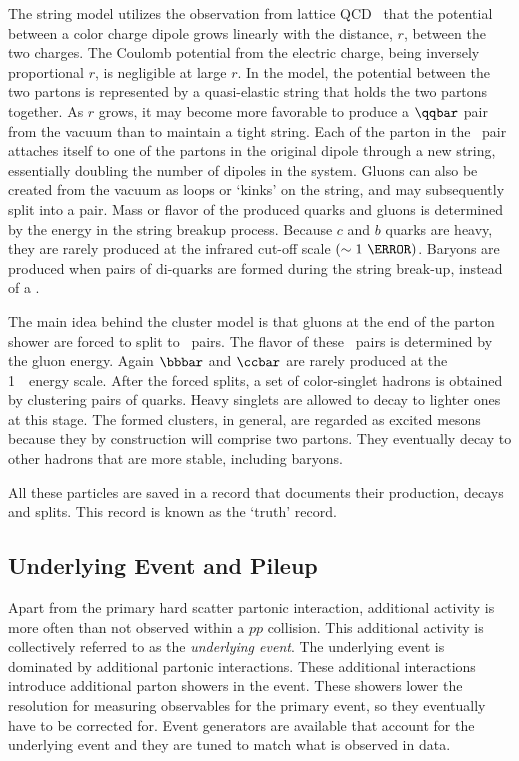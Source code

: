 \par The string model utilizes the observation from lattice QCD~\cite{Gupta:1997nd} that the potential between a color 
charge dipole grows linearly with the distance, $r$, between the two charges. The Coulomb potential from the 
electric charge, being inversely proportional $r$, is negligible at large $r$.   
In the model, the potential between the two partons is represented by a quasi-elastic string 
that holds the two partons together. As $r$ grows, it may become more favorable to produce a 
$\qqbar$ pair from the vacuum than to maintain a tight string. Each of the parton in the \ttbar\ 
pair attaches itself to one of the partons in the original dipole through a new string, essentially 
doubling the number of dipoles in the system. Gluons can also be created from the vacuum as loops or 
`kinks' on the string, and may subsequently split into a \qqbar pair. Mass or flavor of the produced 
quarks and gluons is determined by the energy in the string breakup process. Because $c$ and $b$ quarks are 
heavy, they are rarely produced at the infrared cut-off scale $(\sim 1~\GeV)$. 
Baryons are produced when pairs of di-quarks are formed during the string break-up, instead of a 
\qqbar.

\par The main idea behind the cluster model is that gluons at the end of the parton shower 
are forced to split to \qqbar\ pairs. The flavor of these \qqbar\ pairs is determined by the 
gluon energy. Again $\bbbar$ and $\ccbar$ are rarely produced at the 1~\GeV\ energy scale. 
After the forced splits, a set of color-singlet hadrons is obtained by clustering pairs of 
quarks. Heavy singlets are allowed to decay to lighter ones at this stage. The formed clusters, in general, 
are regarded as excited mesons because they by construction will comprise two partons. 
They eventually decay to other hadrons that are more stable, including baryons.     

\par All these particles are saved in a record that documents their production, decays and splits. 
This record is known as the `truth' record. 

\subsection{Underlying Event and Pileup}
\par Apart from the primary hard scatter partonic interaction, additional activity is more often than not observed 
within a $pp$ collision. This additional activity is collectively referred to as the {\it underlying event}.
The underlying event is dominated by additional partonic interactions. 
These additional interactions introduce additional parton showers in the event. 
These showers 
lower the resolution for measuring observables for the primary event, so they eventually have to be corrected for.
Event generators are available that account for the underlying event and they are tuned 
to match what is observed in data.  

